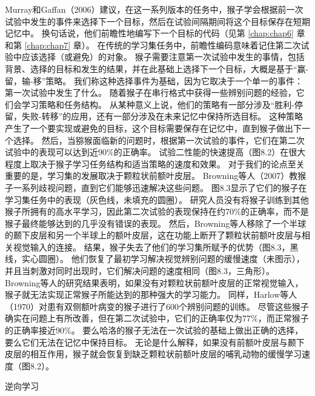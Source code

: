 Murray和Gaffan（2006）建议，在这一系列版本的任务中，猴子学会根据前一次试验中发生的事件来选择下一个目标，然后在试验间隔期间将这个目标保存在短期记忆中。
换句话说，他们前瞻性地编写下一个目标的代码（见第 \ref{chap:chap6} 章和第 \ref{chap:chap7} 章）。
在传统的学习集任务中，前瞻性编码意味着记住第二次试验中应该选择（或避免）的对象。
猴子需要注意第一次试验中发生的事情，包括背景、选择的目标和发生的结果，并在此基础上选择下一个目标，大概是基于“赢-留，输-移”策略。
我们称这种选择事件为基础，因为它取决于一个单一的事件：第一次试验中发生了什么。
随着猴子在串行格式中获得一些辨别问题的经验，它们会学习策略和任务结构。
从某种意义上说，他们的策略有一部分涉及“胜利-停留，失败-转移”的应用，还有一部分涉及在未来记忆中保持所选目标。
这种策略产生了一个要实现或避免的目标，这个目标需要保存在记忆中，直到猴子做出下一个选择。
然后，当猕猴面临新的问题时，根据第一次试验的事件，它们在第二次试验中的表现可以达到近90$\%$的正确率。
试验二性能的快速提高（图8.2）在很大程度上取决于猴子学习任务结构和适当策略的速度和效果。
对于我们的论点至关重要的是，学习集的发展取决于颗粒状前额叶皮层。
Browning等人（2007）教猴子一系列歧视问题，直到它们能够迅速解决这些问题。
图8.3显示了它们的猴子在学习集任务中的表现（灰色线，未填充的圆圈）。
研究人员没有将猴子训练到其他猴子所拥有的高水平学习，因此第二次试验的表现保持在约70$\%$的正确率，而不是猴子最终能够达到的几乎没有错误的表现。
然后，Browning等人移除了一个半球的颞下皮层和另一个半球上的额叶皮层，这在功能上断开了颗粒状前额叶皮层与相关视觉输入的连接。
结果，猴子失去了他们的学习集所赋予的优势（图8.3，黑线，实心圆圈）。
他们恢复了最初学习解决视觉辨别问题的缓慢速度（未图示），并且当刺激对同时出现时，它们解决问题的速度相同（图8.3，三角形）。
Browning等人的研究结果表明，如果没有对颗粒状前额叶皮层的正常视觉输入，猴子就无法实现正常猴子所能达到的那种强大的学习能力。
同样，Harlow等人（1970）对患有双侧额叶病变的猴子进行了600个辨别问题的训练。
尽管这些猴子确实在问题上有所改善，但在第二次试验中，它们的正确率仅为77$\%$，而正常猴子的正确率接近90$\%$。
要么哈洛的猴子无法在一次试验的基础上做出正确的选择，要么它们无法在记忆中保持目标。
无论是什么解释，如果没有前额叶皮层与颞下皮层的相互作用，猴子就会恢复到缺乏颗粒状前额叶皮层的哺乳动物的缓慢学习速度（图8.2）。



逆向学习

